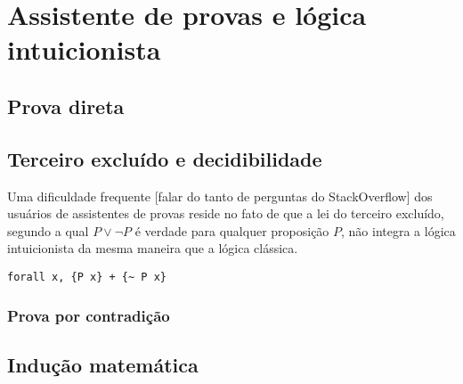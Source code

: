 \chapter{Assistente de provas e lógica intuicionista}
\label{cap:coq}

\section{Prova direta}

\section{Terceiro excluído e decidibilidade}

Uma dificuldade frequente [falar do tanto de perguntas do StackOverflow] dos usuários de assistentes de provas reside no fato de que a lei do terceiro excluído, segundo a qual $P \vee \neg P$ é verdade para qualquer proposição $P$, não integra a lógica intuicionista da mesma maneira que a lógica clássica.

\begin{verbatim}
forall x, {P x} + {~ P x}
\end{verbatim}

\subsection{Prova por contradição}

\section{Indução matemática}
